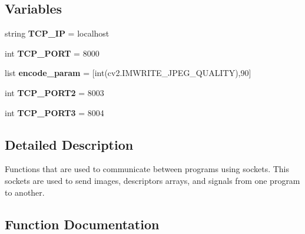 \subsection*{Variables}
\begin{DoxyCompactItemize}
\item 
string {\bfseries T\+C\+P\+\_\+\+IP} = \textquotesingle{}localhost\textquotesingle{}\hypertarget{namespacesend__socket_aff9c2ee4276f3f540e8597971a6a69d4}{}\label{namespacesend__socket_aff9c2ee4276f3f540e8597971a6a69d4}

\item 
int {\bfseries T\+C\+P\+\_\+\+P\+O\+RT} = 8000\hypertarget{namespacesend__socket_a801276ca5aa52628cd225cff57bc6716}{}\label{namespacesend__socket_a801276ca5aa52628cd225cff57bc6716}

\item 
list {\bfseries encode\+\_\+param} = \mbox{[}int(cv2.\+I\+M\+W\+R\+I\+T\+E\+\_\+\+J\+P\+E\+G\+\_\+\+Q\+U\+A\+L\+I\+TY),90\mbox{]}\hypertarget{namespacesend__socket_a6eb06582ba93cc3bd473c5b28670f21e}{}\label{namespacesend__socket_a6eb06582ba93cc3bd473c5b28670f21e}

\item 
int {\bfseries T\+C\+P\+\_\+\+P\+O\+R\+T2} = 8003\hypertarget{namespacesend__socket_a2b20b13c6b71b5d1a811e722e0aa90ac}{}\label{namespacesend__socket_a2b20b13c6b71b5d1a811e722e0aa90ac}

\item 
int {\bfseries T\+C\+P\+\_\+\+P\+O\+R\+T3} = 8004\hypertarget{namespacesend__socket_a7c53b9a62faec74925fe77823b6c93c3}{}\label{namespacesend__socket_a7c53b9a62faec74925fe77823b6c93c3}

\end{DoxyCompactItemize}


\subsection{Detailed Description}
\begin{DoxyVerb}Functions that are used to communicate between programs using sockets.
This sockets are used to send images, descriptors arrays, and signals from one program to another. 
\end{DoxyVerb}
 

\subsection{Function Documentation}
